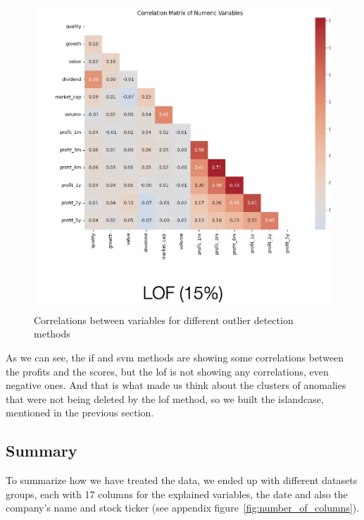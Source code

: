 \documentclass[11pt,english,a4paper,hidelinks]{book}
\begin{document}
\begin{figure}[H]
\begin{minipage}{0.32\textwidth}
    \end{minipage}
    \hfill
    \begin{minipage}{0.32\textwidth}
        \centering
        \includegraphics[width=\textwidth]{images/code/outliers/LOF 15.png}
    \end{minipage}
    \caption{Correlations between variables for different outlier detection methods}
    \label{fig:island_cases_examples}
\end{figure}

\noindent As we can see, the \acrshort{if} and \acrshort{svm} methods are showing some correlations between the profits and the scores, but the \acrshort{lof} is not showing any correlations, even negative ones. And that is what made us think about the clusters of anomalies that were not being deleted by the \acrshort{lof} method, so we built the \acrshort{islandcase}, mentioned in the previous section.


\subsection{Summary}

\noindent To summarize how we have treated the data, we ended up with different datasets groups, each with 17 columns for the explained variables, the date and also the company's name and stock ticker (see appendix figure~\ref{fig:number_of_columns}).
\end{document}
